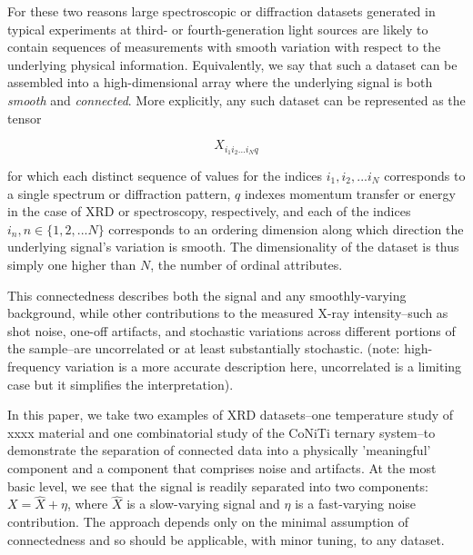 \documentclass[12pt]{iopart}
\begin{document}

For these two reasons large spectroscopic or diffraction datasets generated in typical experiments at third- or fourth-generation light sources are likely to contain sequences of measurements with smooth variation with respect to the underlying physical information. Equivalently, we say that such a dataset can be assembled into a high-dimensional array where the underlying signal is both \emph{smooth} and \emph{connected}. More explicitly, any such dataset can be represented as the tensor

\begin{equation}
X_{i_1i_2...i_Nq}
\end{equation}

for which each distinct sequence of values for the indices $i_1, i_2,...
i_N$ corresponds to a single spectrum or diffraction pattern, $q$
indexes momentum transfer or energy in the case of XRD or spectroscopy,
respectively, and each of the indices $i_n, n \in \{1, 2, ... N\}$
corresponds to an ordering dimension along which direction the
underlying signal's variation is smooth. The dimensionality of the
dataset is thus simply one higher than $N$, the number of ordinal
attributes.


This connectedness describes both the signal and any smoothly-varying
background, while other contributions to the measured X-ray
intensity--such as shot noise, one-off artifacts, and stochastic
variations across different portions of the sample--are uncorrelated or
at least substantially stochastic. (note: high-frequency variation is a
more accurate description here, uncorrelated is a limiting case but it
simplifies the interpretation).

In this paper, we take two examples of XRD datasets--one temperature
study of xxxx material and one combinatorial study of the CoNiTi
ternary system--to demonstrate the separation of connected data into
a physically 'meaningful' component and a component that comprises
noise and artifacts. At the most basic level, we see that the signal
is readily separated into two components: $X = \hat{X} + \eta$, where
$\hat{X}$ is a slow-varying signal and $\eta$ is a fast-varying noise
contribution. The approach depends only on the minimal assumption of
connectedness and so should be applicable, with minor tuning, to any
dataset.
\end{document}
